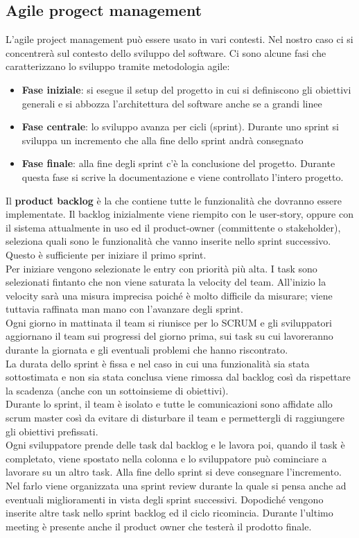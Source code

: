 \subsection{Agile progect management}
L'agile project management può essere usato in vari contesti.
Nel nostro caso ci si concentrerà sul contesto dello sviluppo del software.
Ci sono alcune fasi che caratterizzano lo sviluppo tramite metodologia agile:
\begin{itemize}[noitemsep]
    \item \textbf{Fase iniziale}: si esegue il setup del progetto in cui si definiscono gli obiettivi generali e si abbozza l'architettura del software anche se a grandi linee
    \item \textbf{Fase centrale}: lo sviluppo avanza per cicli (sprint). Durante uno sprint si sviluppa un incremento che alla fine dello sprint andrà consegnato
    \item \textbf{Fase finale}: alla fine degli sprint c'è la conclusione del progetto. Durante questa fase si scrive la documentazione e viene controllato l'intero progetto.
\end{itemize}
Il \textbf{product backlog} è la  che contiene tutte le funzionalità che dovranno essere implementate.
Il backlog inizialmente viene riempito con le user-story, oppure con il sistema attualmente in uso ed il product-owner (committente o stakeholder), seleziona quali sono le funzionalità che vanno inserite nello sprint successivo.
Questo è sufficiente per iniziare il primo sprint.\\
Per iniziare vengono selezionate le entry con priorità più alta.
I task sono selezionati fintanto che non viene saturata la velocity del team.
All'inizio la velocity sarà una misura imprecisa poiché è molto difficile da misurare; viene tuttavia raffinata man mano con l'avanzare degli sprint.\\
Ogni giorno in mattinata il team si riunisce per lo SCRUM e gli sviluppatori aggiornano il team sui progressi del giorno prima, sui task su cui lavoreranno durante la giornata e gli eventuali problemi che hanno riscontrato.\\
La durata dello sprint è fissa e nel caso in cui una funzionalità sia stata sottostimata e non sia stata conclusa viene rimossa dal backlog così da rispettare la scadenza (anche con un sottoinsieme di obiettivi).\\
Durante lo sprint, il team è isolato e tutte le comunicazioni sono affidate allo scrum master così da evitare di disturbare il team e permettergli di raggiungere gli obiettivi prefissati.\\
Ogni sviluppatore prende delle task dal backlog e le lavora poi, quando il task è completato, viene spostato nella colonna  e lo sviluppatore può cominciare a lavorare su un altro task.
Alla fine dello sprint si deve consegnare l'incremento.
Nel farlo viene organizzata una sprint review durante la quale si pensa anche ad eventuali miglioramenti in vista degli sprint successivi.
Dopodiché vengono inserite altre task nello sprint backlog ed il ciclo ricomincia.
Durante l'ultimo meeting è presente anche il product owner che testerà il prodotto finale.\\


